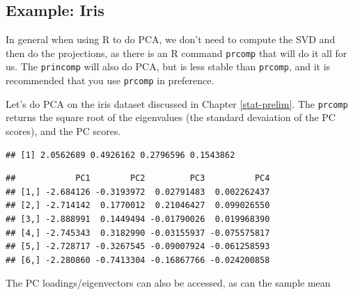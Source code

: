 \documentclass[
]{book}
\newenvironment{Shaded}{\begin{snugshade}}{\end{snugshade}}
\newcommand{\CommentTok}[1]{\textcolor[rgb]{0.56,0.35,0.01}{\textit{#1}}}
\newcommand{\DecValTok}[1]{\textcolor[rgb]{0.00,0.00,0.81}{#1}}
\newcommand{\FunctionTok}[1]{\textcolor[rgb]{0.13,0.29,0.53}{\textbf{#1}}}
\newcommand{\NormalTok}[1]{#1}
\newcommand{\OtherTok}[1]{\textcolor[rgb]{0.56,0.35,0.01}{#1}}
\newcommand{\SpecialCharTok}[1]{\textcolor[rgb]{0.81,0.36,0.00}{\textbf{#1}}}
\theoremstyle{definition}
\theoremstyle{definition}
\theoremstyle{definition}
\theoremstyle{definition}
\theoremstyle{remark}
\begin{document}
\subsection{Example: Iris}\label{example-iris}

In general when using R to do PCA, we don't need to compute the SVD and then do the projections, as there is an R command \texttt{prcomp} that will do it all for us. The \texttt{princomp} will also do PCA, but is less stable than \texttt{prcomp}, and it is recommended that you use \texttt{prcomp} in preference.

Let's do PCA on the iris dataset discussed in Chapter \ref{stat-prelim}. The \texttt{prcomp} returns the square root of the eigenvalues (the standard devaiation of the PC scores), and the PC scores.

\begin{Shaded}
\end{Shaded}

\begin{verbatim}
## [1] 2.0562689 0.4926162 0.2796596 0.1543862
\end{verbatim}

\begin{Shaded}
\end{Shaded}

\begin{verbatim}
##            PC1        PC2         PC3          PC4
## [1,] -2.684126 -0.3193972  0.02791483  0.002262437
## [2,] -2.714142  0.1770012  0.21046427  0.099026550
## [3,] -2.888991  0.1449494 -0.01790026  0.019968390
## [4,] -2.745343  0.3182990 -0.03155937 -0.075575817
## [5,] -2.728717 -0.3267545 -0.09007924 -0.061258593
## [6,] -2.280860 -0.7413304 -0.16867766 -0.024200858
\end{verbatim}

The PC loadings/eigenvectors can also be accessed, as can the sample mean

\begin{Shaded}
\end{Shaded}
\end{document}
